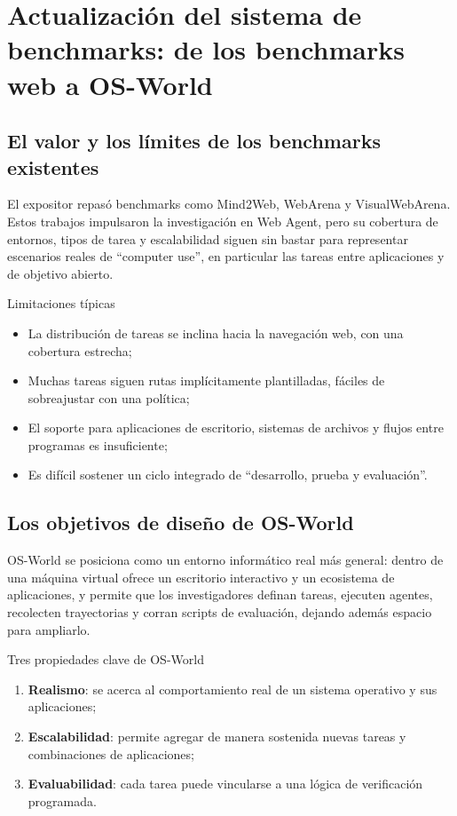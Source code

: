 \section{Actualización del sistema de benchmarks: de los benchmarks web a OS-World}

\subsection{El valor y los límites de los benchmarks existentes}
El expositor repasó benchmarks como Mind2Web, WebArena y VisualWebArena. Estos trabajos impulsaron la investigación en Web Agent, pero su cobertura de entornos, tipos de tarea y escalabilidad siguen sin bastar para representar escenarios reales de ``computer use'', en particular las tareas entre aplicaciones y de objetivo abierto.

\begin{knowledgebox}{Limitaciones típicas}
\begin{itemize}
    \item La distribución de tareas se inclina hacia la navegación web, con una cobertura estrecha;
    \item Muchas tareas siguen rutas implícitamente plantilladas, fáciles de sobreajustar con una política;
    \item El soporte para aplicaciones de escritorio, sistemas de archivos y flujos entre programas es insuficiente;
    \item Es difícil sostener un ciclo integrado de ``desarrollo, prueba y evaluación''.
\end{itemize}
\end{knowledgebox}

\subsection{Los objetivos de diseño de OS-World}
OS-World se posiciona como un entorno informático real más general: dentro de una máquina virtual ofrece un escritorio interactivo y un ecosistema de aplicaciones, y permite que los investigadores definan tareas, ejecuten agentes, recolecten trayectorias y corran scripts de evaluación, dejando además espacio para ampliarlo.

\begin{importantbox}{Tres propiedades clave de OS-World}
\begin{enumerate}
    \item \textbf{Realismo}: se acerca al comportamiento real de un sistema operativo y sus aplicaciones;
    \item \textbf{Escalabilidad}: permite agregar de manera sostenida nuevas tareas y combinaciones de aplicaciones;
    \item \textbf{Evaluabilidad}: cada tarea puede vincularse a una lógica de verificación programada.
\end{enumerate}
\end{importantbox}


